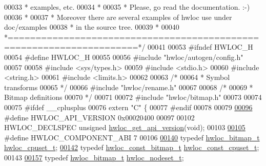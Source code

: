 \begin{DoxyCode}
00033 \textcolor{comment}{ * examples, etc.}
00034 \textcolor{comment}{ *}
00035 \textcolor{comment}{ * Please, go read the documentation.  :-)}
00036 \textcolor{comment}{ *}
00037 \textcolor{comment}{ * Moreover there are several examples of hwloc use under doc/examples}
00038 \textcolor{comment}{ * in the source tree.}
00039 \textcolor{comment}{ *}
00040 \textcolor{comment}{ *=====================================================================*/}
00041 
00053 \textcolor{preprocessor}{#ifndef HWLOC\_H}
00054 \textcolor{preprocessor}{#define HWLOC\_H}
00055 
00056 \textcolor{preprocessor}{#include "hwloc/autogen/config.h"}
00057 
00058 \textcolor{preprocessor}{#include <sys/types.h>}
00059 \textcolor{preprocessor}{#include <stdio.h>}
00060 \textcolor{preprocessor}{#include <string.h>}
00061 \textcolor{preprocessor}{#include <limits.h>}
00062 
00063 \textcolor{comment}{/*}
00064 \textcolor{comment}{ * Symbol transforms}
00065 \textcolor{comment}{ */}
00066 \textcolor{preprocessor}{#include "hwloc/rename.h"}
00067 
00068 \textcolor{comment}{/*}
00069 \textcolor{comment}{ * Bitmap definitions}
00070 \textcolor{comment}{ */}
00071 
00072 \textcolor{preprocessor}{#include "hwloc/bitmap.h"}
00073 
00074 
00075 \textcolor{preprocessor}{#ifdef \_\_cplusplus}
00076 \textcolor{keyword}{extern} \textcolor{stringliteral}{"C"} \{
00077 \textcolor{preprocessor}{#endif}
00078 
00079 
\hyperlink{a00182_ga8f4dfb8eef138af55dd1a0fa802e5476}{00096} \textcolor{preprocessor}{#define HWLOC\_API\_VERSION 0x00020400}
00097 
00102 HWLOC\_DECLSPEC \textcolor{keywordtype}{unsigned} \hyperlink{a00182_ga9c0b50c98add1adf57ed1ce85bb5190d}{hwloc\_get\_api\_version}(\textcolor{keywordtype}{void});
00103 
\hyperlink{a00182_gaac5bc1f46f55e10ef0141a68ce70e21f}{00105} \textcolor{preprocessor}{#define HWLOC\_COMPONENT\_ABI 7}
00106 
\hyperlink{a00183_ga4bbf39b68b6f568fb92739e7c0ea7801}{00140} \textcolor{keyword}{typedef} \hyperlink{a00205_gaa3c2bf4c776d603dcebbb61b0c923d84}{hwloc\_bitmap\_t} \hyperlink{a00183_ga4bbf39b68b6f568fb92739e7c0ea7801}{hwloc\_cpuset\_t};
\hyperlink{a00183_ga1f784433e9b606261f62d1134f6a3b25}{00142} \textcolor{keyword}{typedef} \hyperlink{a00205_gae991a108af01d408be2776c5b2c467b2}{hwloc\_const\_bitmap\_t} \hyperlink{a00183_ga1f784433e9b606261f62d1134f6a3b25}{hwloc\_const\_cpuset\_t};
00143 
\hyperlink{a00183_ga37e35730fa7e775b5bb0afe893d6d508}{00157} \textcolor{keyword}{typedef} \hyperlink{a00205_gaa3c2bf4c776d603dcebbb61b0c923d84}{hwloc\_bitmap\_t} \hyperlink{a00183_ga37e35730fa7e775b5bb0afe893d6d508}{hwloc\_nodeset\_t};

\end{DoxyCode}
